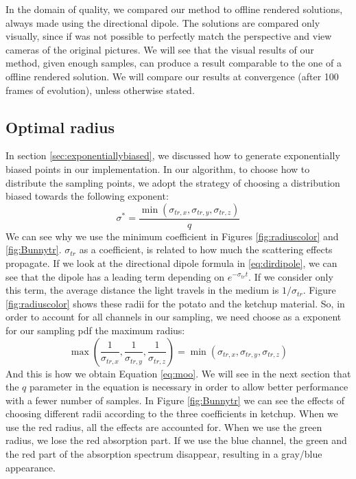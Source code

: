 In the domain of quality, we compared our method to offline rendered solutions, always made using the directional dipole. The solutions are compared only visually, since if was not possible to perfectly match the perspective and view cameras of the original pictures. We will see that the visual results of our method, given enough samples, can produce a result comparable to the one of a offline rendered solution. We will compare our results at convergence (after 100 frames of evolution), unless otherwise stated.

\subsection{Optimal radius}
\label{sec:radius}
In section \ref{sec:exponentiallybiased}, we discussed how to generate exponentially biased points in our implementation. In our algorithm, to choose how to distribute the sampling points, we adopt the strategy of choosing a distribution biased towards the following exponent:
$$
\sigma^* = \frac{\min(\sigma_{tr,x},\sigma_{tr,y},\sigma_{tr,z})}{q}
\label{eq:moo}
$$
We can see why we use the minimum coefficient in Figures \ref{fig:radiuscolor} and \ref{fig:Bunnytr}. $\sigma_{tr}$ as a coefficient, is related to how much the scattering effects propagate. If we look at the directional dipole formula in \ref{eq:dirdipole}, we can see that the dipole has a leading term depending on $e^{-\sigma_{tr} t}$. If we consider only this term, the average distance the light travels in the medium is $1/\sigma_{tr}$. Figure \ref{fig:radiuscolor} shows these radii for the potato and the ketchup material. So, in order to account for all channels in our sampling, we need choose as a exponent for our sampling pdf the maximum radius:
$$
\max\left(\frac{1}{\sigma_{tr,x}},\frac{1}{\sigma_{tr,y}},\frac{1}{\sigma_{tr,z}}\right) = \min(\sigma_{tr,x},\sigma_{tr,y},\sigma_{tr,z})
$$
And this is how we obtain Equation \ref{eq:moo}. We will see in the next section that the $q$ parameter in the equation is necessary in order to allow better performance with a fewer number of samples. In Figure \ref{fig:Bunnytr} we can see the effects of choosing different radii according to the three coefficients in ketchup. When we use the red radius, all the effects are accounted for. When we use the green radius, we lose the red absorption part. If we use the blue channel, the green and the red part of the absorption spectrum disappear, resulting in a gray/blue appearance.

